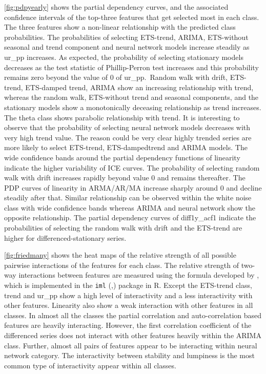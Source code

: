 \documentclass[11pt,a4paper,]{article}
\begin{document}
\autoref{fig:pdpyearly} shows the partial dependency curves, and the
associated confidence intervals of the top-three features that get
selected most in each class. The three features show a non-linear
relationship with the predicted class probabilities. The probabilities
of selecting ETS-trend, ARIMA, ETS-without seasonal and trend component
and neural network models increase steadily as ur\_pp increases. As
expected, the probability of selecting stationary models decreases as
the test statistic of Phillip-Perron test increases and this probability
remains zero beyond the value of 0 of ur\_pp.~Random walk with drift,
ETS-trend, ETS-damped trend, ARIMA show an increasing relationship with
trend, whereas the random walk, ETS-without trend and seasonal
components, and the stationary models show a monotonically deceasing
relationship as trend increases. The theta class shows parabolic
relationship with trend. It is interesting to observe that the
probability of selecting neural network models decreases with very high
trend value. The reason could be very clear highly trended series are
more likely to select ETS-trend, ETS-dampedtrend and ARIMA models. The
wide confidence bands around the partial dependency functions of
linearity indicate the higher variability of ICE curves. The probability
of selecting random walk with drift increases rapidly beyond value 0 and
remains thereafter. The PDP curves of linearity in ARMA/AR/MA increase
sharply around 0 and decline steadily after that. Similar relationship
can be observed within the white noise class with wide confidence bands
whereas ARIMA and neural network show the opposite relationship. The
partial dependency curves of diff1y\_acf1 indicate the probabilities of
selecting the random walk with drift and the ETS-trend are higher for
differenced-stationary series.

\autoref{fig:friedmany} shows the heat maps of the relative strength of
all possible pairwise interactions of the features for each class. The
relative strength of two-way interactions between features are measured
using the formula developed by \textcite{friedman2008predictive}, which
is implemented in the \texttt{iml} (\textcite{molnar2018iml},) package
in R. Except the ETS-trend class, trend and ur\_pp show a high level of
interactivity and a less interactivity with other features. Linearity
also show a weak interaction with other features in all classes. In
almost all the classes the partial correlation and auto-correlation
based features are heavily interacting. However, the first correlation
coefficient of the differenced series does not interact with other
features heavily within the ARIMA class. Further, almost all pairs of
features appear to be interacting within neural network category. The
interactivity between stability and lumpiness is the most common type of
interactivity appear within all classes.
\end{document}
